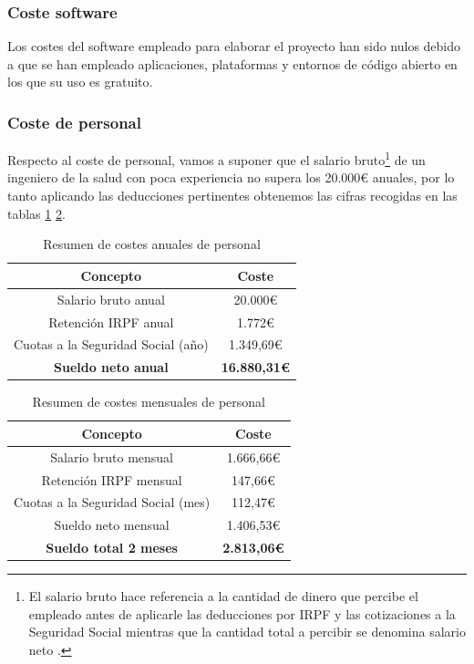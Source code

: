 \subsubsection{Coste software}
Los costes del software empleado para elaborar el proyecto han sido nulos debido a que se han empleado aplicaciones, plataformas y entornos de código abierto en los que su uso es gratuito. 

\subsubsection{Coste de personal}
Respecto al coste de personal, vamos a suponer que el salario bruto\footnote{El salario bruto hace referencia a la cantidad de dinero que percibe el empleado antes de aplicarle las deducciones por IRPF y las cotizaciones a la Seguridad Social mientras que la cantidad total a percibir se denomina salario neto \cite{bruto}. } de un ingeniero de la salud con poca experiencia no supera los 20.000€ anuales, por lo tanto aplicando las deducciones pertinentes obtenemos las cifras recogidas en las tablas \ref{tab:costes-personal} \ref{tab:costes-personal1}.

\begin{table}[h!]
\centering
\begin{tabular}{ |c|c| }
\hline
\rowcolor[HTML]{B0E0E6} 
\textbf{Concepto} & \textbf{Coste} \\
\hline
Salario bruto anual & 20.000€ \\
\hline
Retención IRPF anual & 1.772€ \\
\hline
Cuotas a la Seguridad Social (año) & 1.349,69€ \\
\hline
\rowcolor[HTML]{4682B4} 
\textbf{Sueldo neto anual} & \textbf{16.880,31€} \\
\hline
\end{tabular}
\caption{Resumen de costes anuales de personal}
\label{tab:costes-personal}
\end{table}


\begin{table}[h!]
\centering
\begin{tabular}{ |c|c| }
\hline
\rowcolor[HTML]{B0E0E6} 
\textbf{Concepto} & \textbf{Coste} \\
\hline
Salario bruto mensual & 1.666,66€ \\
\hline
Retención IRPF mensual & 147,66€ \\
\hline
Cuotas a la Seguridad Social (mes) & 112,47€ \\
\hline
Sueldo neto mensual & 1.406,53€ \\
\rowcolor[HTML]{4682B4} 
\textbf{Sueldo total 2 meses} & \textbf{2.813,06€} \\
\hline
\end{tabular}
\caption{Resumen de costes mensuales de personal}
\label{tab:costes-personal1}
\end{table}

